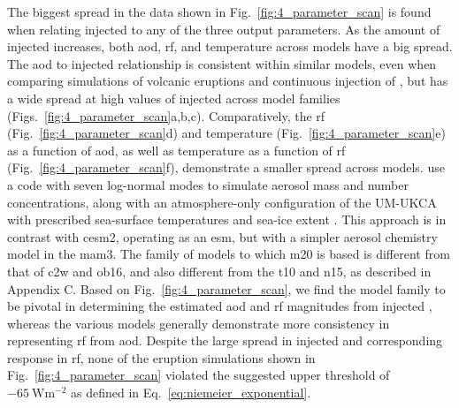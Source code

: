 \documentclass{ametsocV6.1}
\newcommand{\iso}[1][i]{{#1}njected \ce{SO2}}
\begin{document}
The biggest spread in the data shown in Fig.~\ref{fig:4_parameter_scan} is found when
relating \iso{} to any of the three output parameters. As the amount of \iso{}
increases, both \gls{aod}, \gls{rf}, and temperature across models have a big spread.
The \gls{aod} to \iso{} relationship is consistent within similar models, even when
comparing simulations of volcanic eruptions \citep{timmreck2010} and continuous
injection of  \citep{niemeier2015}, but has a wide spread at high values of
\iso{} across model families (Figs.~\ref{fig:4_parameter_scan}a,b,c). Comparatively, the
\gls{rf} (Fig.~\ref{fig:4_parameter_scan}d) and temperature
(Fig.~\ref{fig:4_parameter_scan}e) as a function of \gls{aod}, as well as temperature as
a function of \gls{rf} (Fig.~\ref{fig:4_parameter_scan}f), demonstrate a smaller spread
across models. \citet{marshall2019, marshall2020, marshall2021} use a code with seven
log-normal modes to simulate aerosol mass and number concentrations, along with an
atmosphere-only configuration of the UM-UKCA with prescribed sea-surface temperatures
and sea-ice extent \citep{marshall2019}. This approach is in contrast with \gls{cesm2},
operating as an \gls{esm}, but with a simpler aerosol chemistry model in the \gls{mam3}.
The family of models to which \gls{m20} is based is different from that of \gls{c2w} and
\gls{ob16}, and also different from the \gls{t10} and \gls{n15}, as described in
Appendix C. Based on Fig.~\ref{fig:4_parameter_scan}, we find the model family to be
pivotal in determining the estimated \gls{aod} and \gls{rf} magnitudes from \iso{},
whereas the various models generally demonstrate more consistency in representing
\gls{rf} from \gls{aod}. Despite the large spread in \iso{} and corresponding response
in \gls{rf}, none of the eruption simulations shown in Fig.~\ref{fig:4_parameter_scan}
violated the suggested upper threshold of \(\SI{-65}{\watt\metre^{-2}}\) as defined in
Eq.~\ref{eq:niemeier_exponential}.
\end{document}
